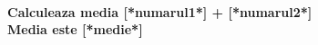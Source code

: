\documentclass{exam}
\begin{document}
\paragraph{
Calculeaza media [*numarul1*] + [*numarul2*]\\
Media este [*medie*]
}
\end{document}
